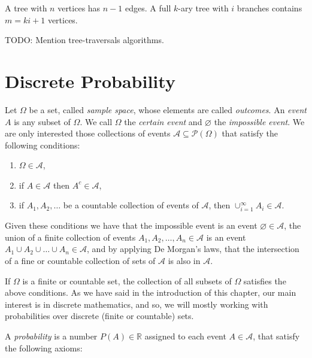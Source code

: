 \begin{example}
A tree with $n$ vertices has $n-1$ edges. A full $k$-ary tree with $i$ branches contains $m=ki+1$ vertices.
\end{example}

{\color{red} TODO: Mention tree-traversals algorithms.}

%
%

\section{Discrete Probability}
\label{sec:probability}

Let $\Omega$ be a set, called \emph{sample space}, whose elements are called \emph{outcomes}. An \emph{event} $A$ is any subset of $\Omega$. We call $\Omega$ the \emph{certain event} and $\varnothing$ the \emph{impossible event}. We are only interested those collections of events $\mathcal{A} \subseteq \mathcal{P}\left( \Omega \right)$ that satisfy the following conditions:

\begin{enumerate}[label=(\roman*)]
\item $\Omega \in \mathcal{A}$, 
\item if $A \in \mathcal{A}$ then $A^c \in \mathcal{A}$,
\item if $A_1, A_2, \ldots$ be a countable collection of events of $\mathcal{A}$, then $\cup_{i=1}^\infty A_i \in \mathcal{A}$.
\end{enumerate}

Given these conditions we have that the impossible event is an event $\varnothing \in \mathcal{A}$, the union of a finite collection of events $A_1, A_2, \ldots, A_n \in \mathcal{A}$ is an event $A_1 \cup A_2 \cup \ldots \cup A_n \in \mathcal{A}$, and by applying De Morgan's laws, that the intersection of a fine or countable collection of sets of $\mathcal{A}$ is also in $\mathcal{A}$.

If $\Omega$ is a finite or countable set, the collection of all subsets of $\Omega$ satisfies the above conditions. As we have said in the introduction of this chapter, our main interest is in discrete mathematics, and so, we will mostly working with probabilities over discrete (finite or countable) sets.

A \emph{probability} is a number $P(A) \in \mathbb{R}$ assigned to each event $A \in \mathcal{A}$, that satisfy the following axioms:

